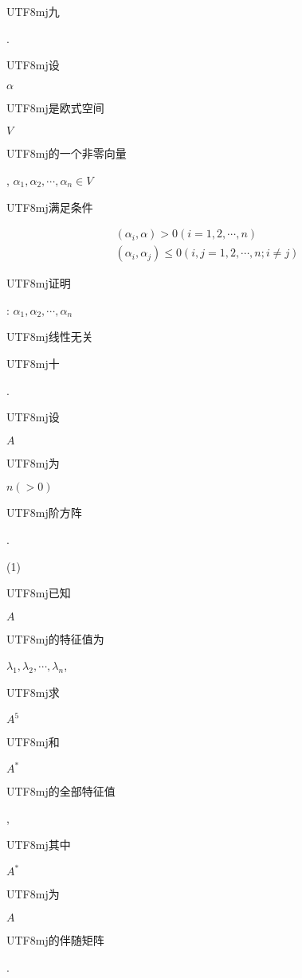 \documentclass[10pt]{article}
\begin{document}
\begin{CJK}{UTF8}{mj}九\end{CJK}. \begin{CJK}{UTF8}{mj}设\end{CJK} $\alpha$ \begin{CJK}{UTF8}{mj}是欧式空间\end{CJK} $V$ \begin{CJK}{UTF8}{mj}的一个非零向量\end{CJK}, $\alpha_{1}, \alpha_{2}, \cdots, \alpha_{n} \in V$ \begin{CJK}{UTF8}{mj}满足条件\end{CJK}
$$
\begin{gathered}
\left(\alpha_{i}, \alpha\right)>0(i=1,2, \cdots, n) \\
\left(\alpha_{i}, \alpha_{j}\right) \leqslant 0(i, j=1,2, \cdots, n ; i \neq j)
\end{gathered}
$$
\begin{CJK}{UTF8}{mj}证明\end{CJK}: $\alpha_{1}, \alpha_{2}, \cdots, \alpha_{n}$ \begin{CJK}{UTF8}{mj}线性无关\end{CJK} \begin{CJK}{UTF8}{mj}十\end{CJK}. \begin{CJK}{UTF8}{mj}设\end{CJK} $A$ \begin{CJK}{UTF8}{mj}为\end{CJK} $n(>0)$ \begin{CJK}{UTF8}{mj}阶方阵\end{CJK}.

(1) \begin{CJK}{UTF8}{mj}已知\end{CJK} $A$ \begin{CJK}{UTF8}{mj}的特征值为\end{CJK} $\lambda_{1}, \lambda_{2}, \cdots, \lambda_{n}$, \begin{CJK}{UTF8}{mj}求\end{CJK} $A^{5}$ \begin{CJK}{UTF8}{mj}和\end{CJK} $A^{*}$ \begin{CJK}{UTF8}{mj}的全部特征值\end{CJK}, \begin{CJK}{UTF8}{mj}其中\end{CJK} $A^{*}$ \begin{CJK}{UTF8}{mj}为\end{CJK} $A$ \begin{CJK}{UTF8}{mj}的伴随矩阵\end{CJK}.
\end{document}
